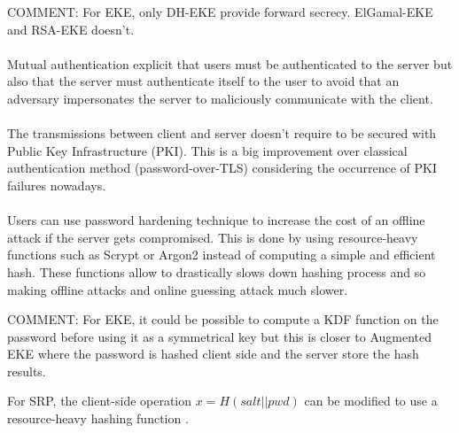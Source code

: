 \documentclass[../report.tex]{subfiles}
\begin{document}
COMMENT: For EKE, only DH-EKE provide forward secrecy. ElGamal-EKE and RSA-EKE doesn't.

\paragraph{}
Mutual authentication explicit that users must be authenticated to the server but also that the server must authenticate itself to the user to avoid that an adversary impersonates the server to maliciously communicate with the client.

\paragraph{} %
The transmissions between client and server doesn't require to be secured with Public Key Infrastructure (PKI). This is a big improvement over classical authentication method (password-over-TLS) considering the occurrence of PKI failures nowadays. %

\paragraph{}
Users can use password hardening technique to increase the cost of an offline attack if the server gets compromised. This is done by using resource-heavy functions such as Scrypt \cite{Scrypt_Paper} or Argon2 \cite{Argon2_Paper} instead of computing a simple and efficient hash. These functions allow to drastically slows down hashing process and so making offline attacks and online guessing attack much slower.

COMMENT: For EKE, it could be possible to compute a KDF function on the password before using it as a symmetrical key but this is closer to Augmented EKE \cite{AEKE_Paper} where the password is hashed client side and the server store the hash results.

For SRP, the client-side operation $x = H(salt||pwd)$ can be modified to use a resource-heavy hashing function \cite{SRP_1Password_blog}.
\end{document}
